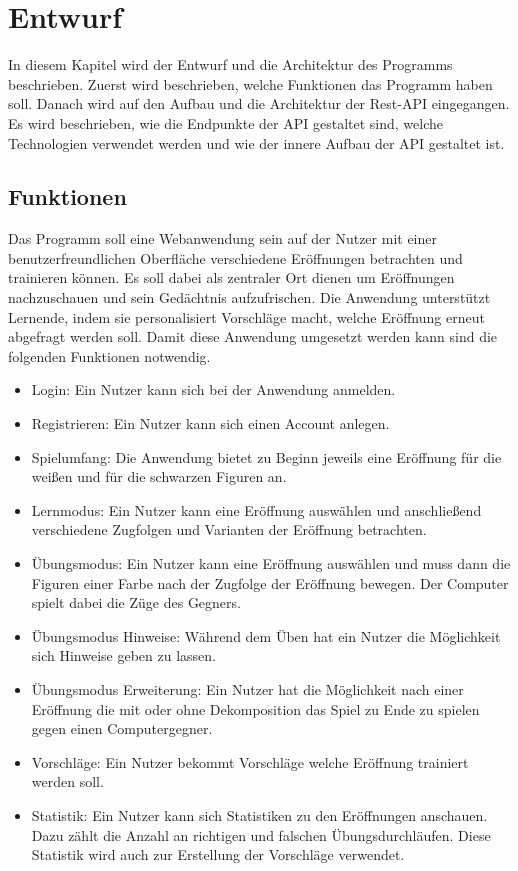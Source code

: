 
\chapter{Entwurf} %
In diesem Kapitel wird der Entwurf und die Architektur des Programms beschrieben. Zuerst wird beschrieben, welche Funktionen das Programm haben soll. Danach wird auf den Aufbau und die Architektur der Rest-API eingegangen. Es wird beschrieben, wie die Endpunkte der API gestaltet sind, welche Technologien verwendet werden und wie der innere Aufbau der API gestaltet ist.


\section{Funktionen}
Das Programm soll eine Webanwendung sein auf der Nutzer mit einer benutzerfreundlichen Oberfläche verschiedene Eröffnungen betrachten und trainieren können. Es soll dabei als zentraler Ort dienen um Eröffnungen nachzuschauen und sein Gedächtnis aufzufrischen. Die Anwendung unterstützt Lernende, indem sie personalisiert Vorschläge macht, welche Eröffnung erneut abgefragt werden soll. Damit diese Anwendung umgesetzt werden kann sind die folgenden Funktionen notwendig.

\begin{itemize}
    \item Login: Ein Nutzer kann sich bei der Anwendung anmelden.
    \item Registrieren: Ein Nutzer kann sich einen Account anlegen.
    \item Spielumfang: Die Anwendung bietet zu Beginn jeweils eine Eröffnung für die weißen und für die schwarzen Figuren an.
    \item Lernmodus: Ein Nutzer kann eine Eröffnung auswählen und anschließend verschiedene Zugfolgen und Varianten der Eröffnung betrachten.
    \item Übungsmodus: Ein Nutzer kann eine Eröffnung auswählen und muss dann die Figuren einer Farbe nach der Zugfolge der Eröffnung bewegen. Der Computer spielt dabei die Züge des Gegners.
    \item Übungsmodus Hinweise: Während dem Üben hat ein Nutzer die Möglichkeit sich Hinweise geben zu lassen.
    \item Übungsmodus Erweiterung: Ein Nutzer hat die Möglichkeit nach einer Eröffnung die mit oder ohne Dekomposition das Spiel zu Ende zu spielen gegen einen Computergegner.
    \item Vorschläge: Ein Nutzer bekommt Vorschläge welche Eröffnung trainiert werden soll.
    \item Statistik: Ein Nutzer kann sich Statistiken zu den Eröffnungen anschauen. Dazu zählt die Anzahl an richtigen und falschen Übungsdurchläufen. Diese Statistik wird auch zur Erstellung der Vorschläge verwendet.
\end{itemize}

